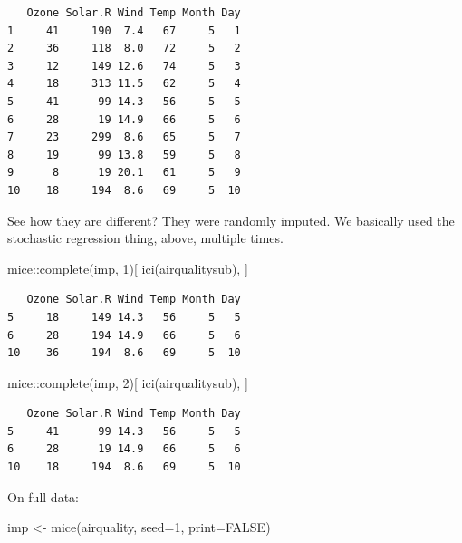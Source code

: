 \documentclass[
  letterpaper,
  DIV=11,
  numbers=noendperiod]{scrreprt}
\newenvironment{Shaded}{}{}
\newcommand{\AttributeTok}[1]{\textcolor[rgb]{0.49,0.56,0.16}{#1}}
\newcommand{\ConstantTok}[1]{\textcolor[rgb]{0.53,0.00,0.00}{#1}}
\newcommand{\DecValTok}[1]{\textcolor[rgb]{0.25,0.63,0.44}{#1}}
\newcommand{\FunctionTok}[1]{\textcolor[rgb]{0.02,0.16,0.49}{#1}}
\newcommand{\NormalTok}[1]{#1}
\newcommand{\OtherTok}[1]{\textcolor[rgb]{0.00,0.44,0.13}{#1}}
\newcommand{\SpecialCharTok}[1]{\textcolor[rgb]{0.25,0.44,0.63}{#1}}
\begin{document}
\begin{verbatim}
   Ozone Solar.R Wind Temp Month Day
1     41     190  7.4   67     5   1
2     36     118  8.0   72     5   2
3     12     149 12.6   74     5   3
4     18     313 11.5   62     5   4
5     41      99 14.3   56     5   5
6     28      19 14.9   66     5   6
7     23     299  8.6   65     5   7
8     19      99 13.8   59     5   8
9      8      19 20.1   61     5   9
10    18     194  8.6   69     5  10
\end{verbatim}

See how they are different? They were randomly imputed. We basically
used the stochastic regression thing, above, multiple times.

\begin{Shaded}
\begin{Highlighting}[]
\NormalTok{  mice}\SpecialCharTok{::}\FunctionTok{complete}\NormalTok{(imp, }\DecValTok{1}\NormalTok{)[ }\FunctionTok{ici}\NormalTok{(airqualitysub), ]}
\end{Highlighting}
\end{Shaded}

\begin{verbatim}
   Ozone Solar.R Wind Temp Month Day
5     18     149 14.3   56     5   5
6     28     194 14.9   66     5   6
10    36     194  8.6   69     5  10
\end{verbatim}

\begin{Shaded}
\begin{Highlighting}[]
\NormalTok{  mice}\SpecialCharTok{::}\FunctionTok{complete}\NormalTok{(imp, }\DecValTok{2}\NormalTok{)[ }\FunctionTok{ici}\NormalTok{(airqualitysub), ]}
\end{Highlighting}
\end{Shaded}

\begin{verbatim}
   Ozone Solar.R Wind Temp Month Day
5     41      99 14.3   56     5   5
6     28      19 14.9   66     5   6
10    18     194  8.6   69     5  10
\end{verbatim}

On full data:

\begin{Shaded}
\begin{Highlighting}[]
\NormalTok{  imp }\OtherTok{\textless{}{-}} \FunctionTok{mice}\NormalTok{(airquality, }\AttributeTok{seed=}\DecValTok{1}\NormalTok{, }\AttributeTok{print=}\ConstantTok{FALSE}\NormalTok{)}
\end{Highlighting}
\end{Shaded}
\end{document}
